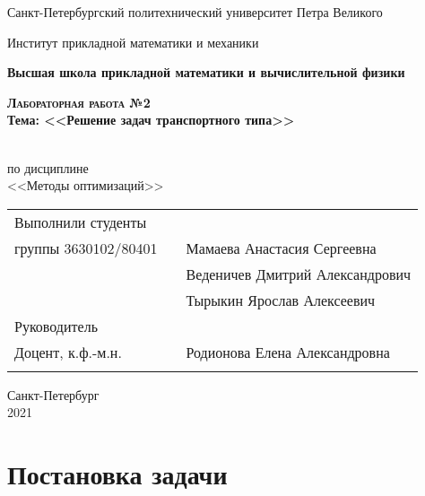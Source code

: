 \documentclass{article}
\begin{document}
\begin{titlepage}
  \begin{center}
  
     
    \large
    
    Санкт-Петербургский политехнический университет Петра Великого
    
    Институт прикладной математики и механики
    
    \textbf{Высшая школа прикладной математики и вычислительной физики}
    
    \vfill
     
     
    \textsc{\textbf{\Large{Лабораторная работа №2}}}\\[5mm]
     
    {\large \textbf{Тема: <<Решение задач транспортного типа>>}}
    
    \\ по дисциплине\\ <<Методы оптимизаций>>\\

\end{center}

\vfill


\begin{tabular}{l p{} l}
Выполнили студенты \\группы 3630102/80401   

&  &Мамаева Анастасия Сергеевна\\
&  &Веденичев Дмитрий Александрович\\
&  &Тырыкин Ярослав Алексеевич\\

Руководитель\\Доцент, к.ф.-м.н.& \hspace{0pt} &   Родионова Елена Александровна \\\\
\end{tabular}

\hfill \break
\hfill \break
\begin{center} Санкт-Петербург \\2021 \end{center}
\thispagestyle{empty}
 
\end{titlepage}
\newpage
\begin{center}
    \setcounter{page}{2}
    \tableofcontents  
\end{center}

\newpage
\section{Постановка задачи}
\end{document}
